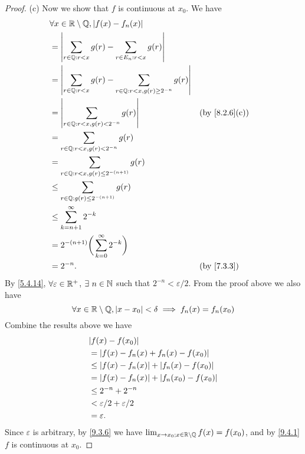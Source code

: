 \begin{proof}{(c)}
  Now we show that \(f\) is continuous at \(x_0\).
  We have
  \begin{align*}
     & \forall x \in \R \setminus \Q, \abs{f(x) - f_n(x)}                                                                     \\
     & = \abs{\sum_{r \in \Q : r < x} g(r) - \sum_{r \in E_n : r < x} g(r)}                                                   \\
     & = \abs{\sum_{r \in \Q : r < x} g(r) - \sum_{r \in \Q : r < x, g(r) \geq 2^{-n}} g(r)}                                  \\
     & = \abs{\sum_{r \in \Q : r < x, g(r) < 2^{-n}} g(r)}                                   &  & \text{(by \cref{8.2.6}(c))} \\
     & = \sum_{r \in \Q : r < x, g(r) < 2^{-n}} g(r)                                                                          \\
     & = \sum_{r \in \Q : r < x, g(r) \leq 2^{-(n + 1)}} g(r)                                                                 \\
     & \leq \sum_{r \in \Q : g(r) \leq 2^{-(n + 1)}} g(r)                                                                     \\
     & \leq \sum_{k = n + 1}^\infty 2^{-k}                                                                                    \\
     & = 2^{-(n + 1)} \bigg(\sum_{k = 0}^\infty 2^{-k}\bigg)                                                                  \\
     & = 2^{-n}.                                                                             &  & \by{7.3.3}
  \end{align*}
  By \cref{5.4.14}, \(\forall \varepsilon \in \mathbb{R}^+\), \(\exists\ n \in \mathbb{N}\) such that \(2^{-n} < \varepsilon / 2\).
  From the proof above we also have
  \[
    \forall x \in \mathbb{R} \setminus \mathbb{Q}, \left\lvert x - x_0\right\rvert < \delta \implies f_n(x) = f_n(x_0) \\
  \]
  Combine the results above we have
  \begin{align*}
     & \abs{f(x) - f(x_0)}                              \\
     & = \abs{f(x) - f_n(x) + f_n(x) - f(x_0)}          \\
     & \leq \abs{f(x) - f_n(x)} + \abs{f_n(x) - f(x_0)} \\
     & = \abs{f(x) - f_n(x)} + \abs{f_n(x_0) - f(x_0)}  \\
     & \leq 2^{-n} + 2^{-n}                             \\
     & < \varepsilon / 2 + \varepsilon / 2              \\
     & = \varepsilon.
  \end{align*}
  Since \(\varepsilon\) is arbitrary, by \cref{9.3.6} we have \(\lim_{x \to x_0 ; x \in \mathbb{R} \setminus \mathbb{Q}} f(x) = f(x_0)\), and by \cref{9.4.1} \(f\) is continuous at \(x_0\).
\end{proof}